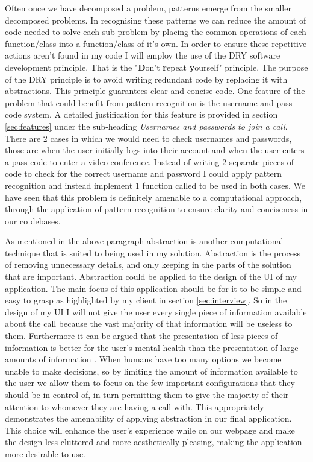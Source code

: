 Often once we have decomposed a problem, patterns emerge from
the smaller decomposed problems. In recognising these patterns
we can reduce the amount of code needed to solve each
sub-problem by placing the common operations of each
function/class into a function/class of it's own. In order to
ensure these repetitive actions aren't found in my code I will
employ the use of the DRY software development principle.
That is the "\textbf{D}on't \textbf{r}epeat \textbf{y}ourself"
principle. The purpose of the DRY principle is to avoid
writing redundant code by replacing it with abstractions. This
principle guarantees clear and concise code. One feature of
the problem that could benefit from pattern recognition is the
username and pass code system. A detailed justification for this
feature is provided in section \ref{sec:features} under the
sub-heading \textit{Usernames and passwords to join a call}.
There are 2 cases in which we would need to check usernames
and passwords, those are when the user initially logs into
their account and when the user enters a pass code to enter a
video conference. Instead of writing 2 separate pieces of
code to check for the correct username and password I could
apply pattern recognition and instead implement 1 function
called  to be used in both
cases. We have seen that this problem is definitely amenable
to a computational approach, through the application of
pattern recognition to ensure clarity and conciseness in our
co debases. \vspace{0.2cm}

As mentioned in the above paragraph abstraction is another
computational technique that is suited to being used in my
solution. Abstraction is the process of removing unnecessary
details, and only keeping in the parts of the solution that are
important. Abstraction could be applied to the design of the
UI of my application. The main focus of this application should
be for it to be simple and easy to grasp as highlighted by my
client in section \ref{sec:interview}. So in the design of my
UI I will not give the user every single piece of information
available about the call because the vast majority of that
information will be useless to them. Furthermore it can be
argued that the presentation of less pieces of information is
better for the user's mental health than the presentation of
large amounts of information \cite{overchoice}. When humans
have too many options we become unable to make decisions, so
by limiting the amount of information available to the user we
allow them to focus on the few important configurations that
they should be
in control of, in turn permitting them to give the majority of
their attention to whomever they are having a call with. This
appropriately demonstrates the amenability of applying
abstraction in our final application. This choice will enhance
the user's experience while on our webpage and make the design
less cluttered and more aesthetically pleasing, making the
application more desirable to use.  \\ \vspace{0.2cm}

